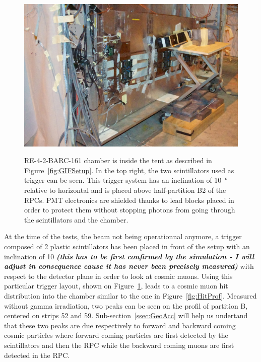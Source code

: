 		\begin{figure}[!h]
			\begin{center}
				\includegraphics[width = \plotwidth]{fig/Setup.jpg}\\
				\caption{\label{fig:RPCSetup} RE-4-2-BARC-161 chamber is inside the tent as described in Figure~\ref{fig:GIFSetup}. In the top right, the two scintillators used as trigger can be seen. This trigger system has an inclination of \SI{10}{\degree} relative to horizontal and is placed above half-partition B2 of the RPCs. PMT electronics are shielded thanks to lead blocks placed in order to protect them without stopping photons from going through the scintillators and the chamber.}
			\end{center}
		\end{figure}
		
		At the time of the tests, the beam not being operationnal anymore, a trigger composed of 2 plastic scintillators has been placed in front of the setup with an inclination of \SI{10}{\deg} \textit{\textbf{(this has to be first confirmed by the simulation - I will adjust in consequence cause it has never been precisely measured)}} with respect to the detector plane in order to look at cosmic muons. Using this particular trigger layout, shown on Figure~\ref{fig:RPCSetup}, leads to a cosmic muon hit distribution into the chamber similar to the one in Figure~\ref{fig:HitProf}. Measured without gamma irradiation, two peaks can be seen on the profil of partition B, centered on strips 52 and 59. Sub-section~\ref{ssec:GeoAcc} will help us undertand that these two peaks are due respectively to forward and backward coming cosmic particles where forward coming particles are first detected by the scintillators and then the RPC while the backward coming muons are first detected in the RPC.

